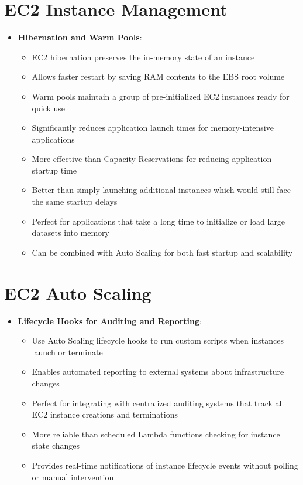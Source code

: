 \documentclass[11pt,a4paper]{report}
\begin{document}
\section{EC2 Instance Management}

\begin{itemize}
  \item \textbf{Hibernation and Warm Pools}:
\begin{itemize}
  \item EC2 hibernation preserves the in-memory state of an instance
  \item Allows faster restart by saving RAM contents to the EBS root volume
  \item Warm pools maintain a group of pre-initialized EC2 instances ready for quick use
  \item Significantly reduces application launch times for memory-intensive applications
  \item More effective than Capacity Reservations for reducing application startup time
  \item Better than simply launching additional instances which would still face the same startup delays
  \item Perfect for applications that take a long time to initialize or load large datasets into memory
  \item Can be combined with Auto Scaling for both fast startup and scalability
\end{itemize}
\end{itemize}


\section{EC2 Auto Scaling}

\begin{itemize}
  \item \textbf{Lifecycle Hooks for Auditing and Reporting}:
\begin{itemize}
  \item Use Auto Scaling lifecycle hooks to run custom scripts when instances launch or terminate
  \item Enables automated reporting to external systems about infrastructure changes
  \item Perfect for integrating with centralized auditing systems that track all EC2 instance creations and terminations
  \item More reliable than scheduled Lambda functions checking for instance state changes
  \item Provides real-time notifications of instance lifecycle events without polling or manual intervention
\end{itemize}
\end{itemize}
\end{document}
